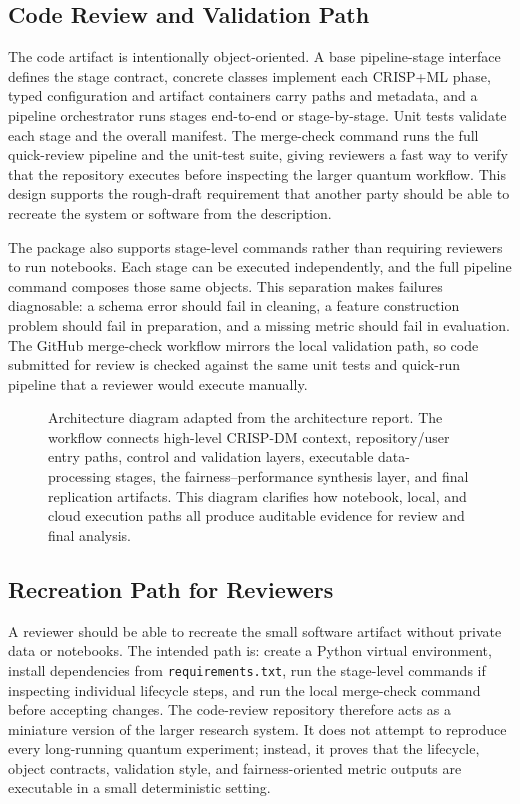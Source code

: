 \documentclass[conference]{IEEEtran}
\begin{document}
\subsection{Code Review and Validation Path}
The code artifact is intentionally object-oriented. A base pipeline-stage
interface defines the stage contract, concrete classes implement each CRISP+ML
phase, typed configuration and artifact containers carry paths and metadata,
and a pipeline orchestrator runs stages end-to-end or stage-by-stage. Unit
tests validate each stage and the overall manifest. The merge-check command
runs the full quick-review pipeline and the unit-test suite, giving reviewers
a fast way to verify that the repository executes before inspecting the larger
quantum workflow. This design supports the rough-draft requirement that
another party should be able to recreate the system or software from the
description.

The package also supports stage-level commands rather than requiring reviewers
to run notebooks. Each stage can be executed independently, and the full
pipeline command composes those same objects. This separation makes failures
diagnosable: a schema error should fail in cleaning, a feature construction
problem should fail in preparation, and a missing metric should fail in
evaluation. The GitHub merge-check workflow mirrors the local validation path,
so code submitted for review is checked against the same unit tests and
quick-run pipeline that a reviewer would execute manually.

\begin{figure}[t]
\centering
\resizebox{0.98\textwidth}{!}{}
\caption{Architecture diagram adapted from the architecture report. The
workflow connects high-level CRISP-DM context, repository/user entry paths,
control and validation layers, executable data-processing stages, the
fairness--performance synthesis layer, and final replication artifacts. This
diagram clarifies how notebook, local, and cloud execution paths all produce
auditable evidence for review and final analysis.}
\label{fig:architecture}
\end{figure}

\subsection{Recreation Path for Reviewers}
A reviewer should be able to recreate the small software artifact without
private data or notebooks. The intended path is: create a Python virtual
environment, install dependencies from \texttt{requirements.txt}, run the
stage-level commands if inspecting individual lifecycle steps, and run the
local merge-check command before accepting changes. The code-review repository
therefore acts as a miniature version of the larger research system. It does
not attempt to reproduce every long-running quantum experiment; instead, it
proves that the lifecycle, object contracts, validation style, and
fairness-oriented metric outputs are executable in a small deterministic
setting.
\end{document}
